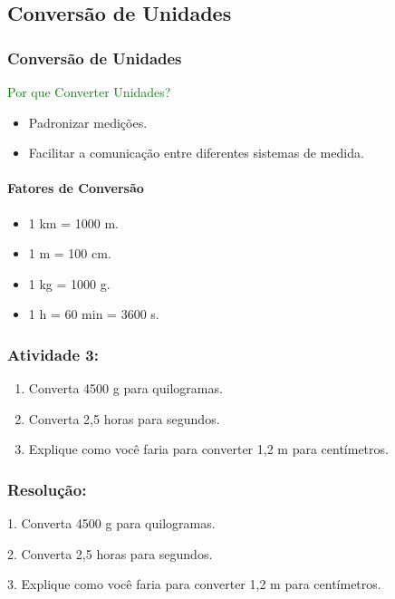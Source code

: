 \documentclass[12pt]{beamer}
\begin{document}
\begin{frame}
    \section{Conversão de Unidades}
    \frametitle{Conversão de Unidades}
    \textcolor{green}{Por que Converter Unidades?}
    \begin{itemize}
        \item Padronizar medições.
        \item Facilitar a comunicação entre diferentes sistemas de medida.
    \end{itemize}

    \framesubtitle{Fatores de Conversão}
    \begin{itemize}
        \item 1 km = 1000 m.
        \item 1 m = 100 cm.
        \item 1 kg = 1000 g.
        \item 1 h = 60 min = 3600 s.
    \end{itemize}

\end{frame}
\begin{frame}
    \frametitle{Atividade 3:}
    \begin{enumerate}
        \item Converta 4500 g para quilogramas.
        \item Converta 2,5 horas para segundos.
        \item Explique como você faria para converter 1,2 m para centímetros.
    \end{enumerate}
\end{frame}

\begin{frame}
\frametitle{Resolução:}
1. Converta 4500 g para quilogramas.
\vspace{6cm}
\end{frame}

\begin{frame}
2. Converta 2,5 horas para segundos.
\vspace{6cm}
\end{frame}

\begin{frame}
3. Explique como você faria para converter 1,2 m para centímetros.
\vspace{6cm}
\end{frame}
\end{document}
